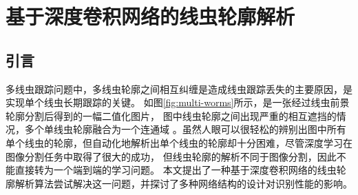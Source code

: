 \chapter{基于深度卷积网络的线虫轮廓解析}
\section{引言}
	多线虫跟踪问题中，多线虫轮廓之间相互纠缠是造成线虫跟踪丢失的主要原因，是实现单个线虫长期跟踪的关键。
	如图\ref{fig:multi-worms}所示，是一张经过线虫前景轮廓分割后得到的一幅二值化图片，
	图中线虫轮廓之间出现严重的相互遮挡的情况，多个单线虫轮廓融合为一个连通域
	。虽然人眼可以很轻松的辨别出图中所有单个线虫的轮廓，但自动化地解析出单个线虫的轮廓却十分困难，尽管深度学习在图像分割任务中取得了很大的成功，
	但线虫轮廓的解析不同于图像分割，因此不能直接转为一个端到端的学习问题。
	本文提出了一种基于深度卷积网络的线虫轮廓解析算法尝试解决这一问题，并探讨了多种网络结构的设计对识别性能的影响。
